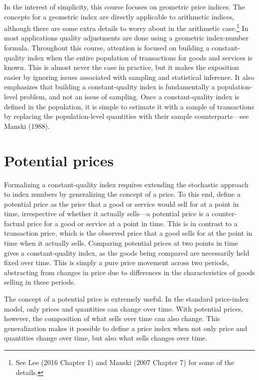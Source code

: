 \documentclass[]{article}
\begin{document}
In the interest of simplicity, this course focuses on geometric price indices. The concepts for a geometric index are directly applicable to arithmetic indices, although there are some extra details to worry about in the arithmetic case.\footnote{See Lee (2016 Chapter 1) and Manski (2007 Chapter 7) for some of the details.} In most applications quality adjustments are done using a geometric index-number formula. Throughout this course, attention is focused on building a constant-quality index when the entire population of transactions for goods and services is known. This is almost never the case in practice, but it makes the exposition easier by ignoring issues associated with sampling and statistical inference. It also emphasizes that building a constant-quality index is fundamentally a population-level problem, and not an issue of sampling. Once a constant-quality index is defined in the population, it is simple to estimate it with a sample of transactions by replacing the population-level quantities with their sample counterparts---see Manski (1988).

\hypertarget{potential-prices}{%
\section{Potential prices}\label{potential-prices}}

Formalizing a constant-quality index requires extending the stochastic approach to index numbers by generalizing the concept of a price. To this end, define a potential price as the price that a good or service would sell for at a point in time, irrespective of whether it actually sells---a potential price is a counter-factual price for a good or service at a point in time. This is in contrast to a transaction price, which is the observed price that a good sells for at the point in time when it actually sells. Comparing potential prices at two points in time gives a constant-quality index, as the goods being compared are necessarily held fixed over time. This is simply a pure price movement across two periods, abstracting from changes in price due to differences in the characteristics of goods selling in these periods.

The concept of a potential price is extremely useful. In the standard price-index model, only prices and quantities can change over time. With potential prices, however, the composition of what sells over time can also change. This generalization makes it possible to define a price index when not only price and quantities change over time, but also what sells changes over time.
\end{document}
